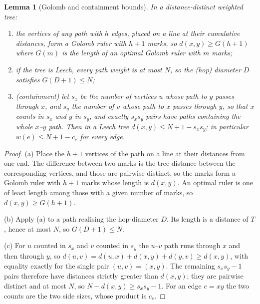 \documentclass[11pt,a4paper]{article}
\theoremstyle{plain}
\newtheorem{lemma}[theorem]{Lemma}
\theoremstyle{remark}
\begin{document}
\begin{lemma}[Golomb and containment bounds]\label{lem:golomb}
In a distance-distinct weighted tree:
\begin{enumerate}
\item[(a)] the vertices of any path with $h$ edges, placed on a line at their
cumulative distances, form a Golomb ruler with $h+1$ marks, so $d(x,y)\ge
G(h+1)$ where $G(m)$ is the length of an optimal Golomb ruler with $m$ marks;
\item[(b)] if the tree is Leech, every path weight is at most $N$, so the (hop)
diameter $D$ satisfies $G(D+1)\le N$;
\item[(c)] (containment) let $s_x$ be the number of vertices $u$ whose path to
$y$ passes through $x$, and $s_y$ the number of $v$ whose path to $x$ passes
through $y$, so that $x$ counts in $s_x$ and $y$ in $s_y$, and exactly $s_xs_y$
pairs have paths containing the whole $x$--$y$ path.  Then in a Leech tree
$d(x,y)\le N+1-s_xs_y$; in particular $w(e)\le N+1-c_e$ for every edge.
\end{enumerate}
\end{lemma}

\begin{proof}
(a) Place the $h+1$ vertices of the path on a line at their distances from one
end.  The difference between two marks is the tree distance between the
corresponding vertices, and those are pairwise distinct, so the marks form a
Golomb ruler with $h+1$ marks whose length is $d(x,y)$.  An optimal ruler is one
of least length among those with a given number of marks, so
$d(x,y)\ge G(h+1)$.

(b) Apply (a) to a path realising the hop-diameter $D$.  Its length is a
distance of $T$, hence at most $N$, so $G(D+1)\le N$.

(c) For $u$ counted in $s_x$ and $v$ counted in $s_y$ the $u$--$v$ path runs
through $x$ and then through $y$, so
$d(u,v)=d(u,x)+d(x,y)+d(y,v)\ge d(x,y)$, with equality exactly for the single
pair $(u,v)=(x,y)$.  The remaining $s_xs_y-1$ pairs therefore have distances
strictly greater than $d(x,y)$; they are pairwise distinct and at most $N$, so
$N-d(x,y)\ge s_xs_y-1$.  For an edge $e=xy$ the two counts are the two side
sizes, whose product is $c_e$.
\end{proof}
\end{document}
